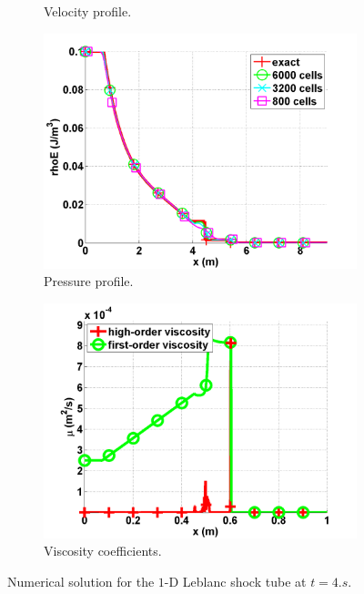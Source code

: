 \begin{figure}[H]
\begin{subfigure}[b]{0.495\textwidth}
                \caption{Velocity profile.}
                \label{fig:1d_leblanc_density}
        \end{subfigure}
        \begin{subfigure}[b]{0.495\textwidth}
                \centering
                \includegraphics[scale=.50]{figures/Leblanc_exact_and_numerical_stt_total_energy_6000.png}
                \caption{Pressure profile.}
                \label{fig:1d_leblanc_press}
        \end{subfigure}
        \begin{subfigure}[b]{0.495\textwidth}
                \centering
                \includegraphics[scale=.50]{figures/Leblanc_viscosity_numerical_6000.png}
                \caption{Viscosity coefficients.}
                \label{fig:1d_leblanc_visc}
        \end{subfigure}
        \caption{Numerical solution for the $1$-D Leblanc shock tube at $t=4.s$.}\label{fig:1d_lebalnc}
\end{figure}
